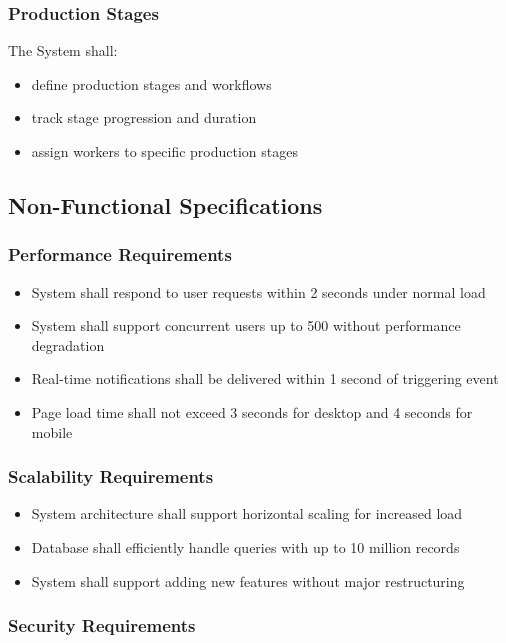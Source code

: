 \subsubsection{Production Stages}
The System shall:
\begin{itemize}
    \item define production stages and workflows
    \item track stage progression and duration
    \item assign workers to specific production stages
\end{itemize}

\subsection{Non-Functional Specifications}
\label{sec:non-functional-specs}

\subsubsection{Performance Requirements}

\begin{itemize}
    \item System shall respond to user requests within 2 seconds under normal load
    \item System shall support concurrent users up to 500 without performance degradation
    \item Real-time notifications shall be delivered within 1 second of triggering event
    \item Page load time shall not exceed 3 seconds for desktop and 4 seconds for mobile
\end{itemize}

\subsubsection{Scalability Requirements}

\begin{itemize}
    \item System architecture shall support horizontal scaling for increased load
    \item Database shall efficiently handle queries with up to 10 million records
    \item System shall support adding new features without major restructuring
\end{itemize}

\subsubsection{Security Requirements}

